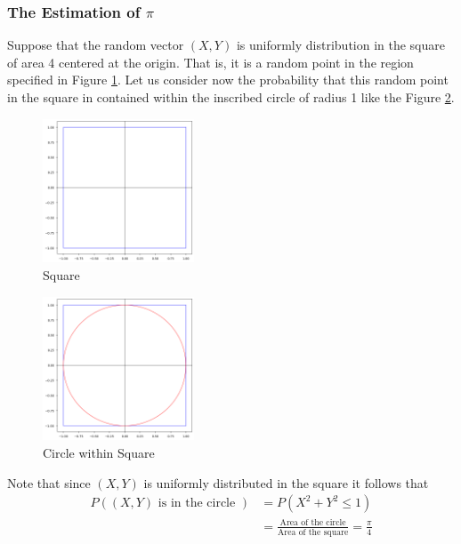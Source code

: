 \newpage
\subsubsection{The Estimation of $\pi$}
Suppose that the random vector $(X,Y)$ is uniformly distribution in the square of area 4
centered at the origin. That is, it is a random point in the region specified in Figure \ref{Square}.
Let us consider now the probability that this random point in the square in contained within the inscribed circle of radius 1
like the Figure \ref{Circle within Square}.

\begin{figure}[H]
	\centering
	\includegraphics[width=0.4\textwidth]{images/square.png}
	\caption{Square}
	\label{Square}
\end{figure}

\begin{figure}[H]
	\centering
	\includegraphics[width=0.4\textwidth]{images/circle.png}
	\caption{Circle within Square}
	\label{Circle within Square}
\end{figure}

Note that since $(X,Y)$ is uniformly distributed in the square it follows that
\begin{align*}
	P((X,Y) \text{ is in the circle } ) & = P(X ^{2}+ Y ^{2}\le 1)                                                        \\
	                                    & = \frac{\text{Area of the circle} }{\text{Area of the square} } = \frac{\pi}{4}
\end{align*}

